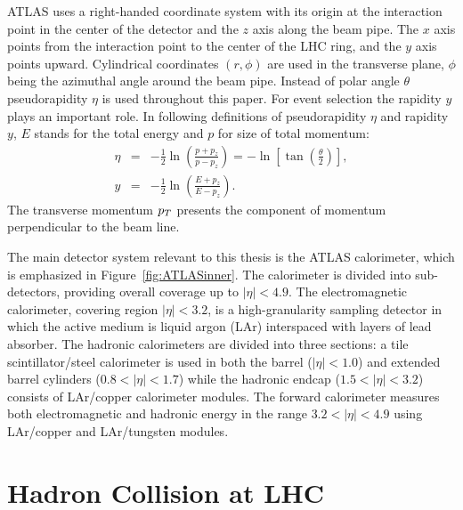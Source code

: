 ATLAS uses a right-handed coordinate system with its origin at the interaction
point in the center of the detector and the $z$ axis along the beam pipe. The
$x$ axis points from the interaction point to the center of the LHC ring, and
the $y$ axis points upward. Cylindrical coordinates $(r, \phi)$ are used in the
transverse plane, $\phi$ being the azimuthal angle around the beam pipe. Instead
of polar angle $\theta$ pseudorapidity $\eta$ is used throughout this paper. For
event selection the rapidity $y$ plays an important role. In following
definitions of pseudorapidity $\eta$ and rapidity $y$, $E$ stands for the total
energy and $p$ for size of total momentum: 
\begin{eqnarray}
  \eta &= & - \frac{1}{2} \ln \left( \frac{p+p_z}{p-p_z} \right) = - \ln \left[
  \tan \left( \frac{\theta}{2} \right) \right], \\ y &= &- \frac{1}{2} \ln
  \left( \frac{E+p_z}{E-p_z} \right).	
\end{eqnarray}
The transverse momentum $p_T$ presents the component of momentum perpendicular
to the beam line.  

The main detector system relevant to this thesis is the ATLAS calorimeter,
which is emphasized in Figure~\ref{fig:ATLASinner}. The calorimeter is divided
into sub-detectors, providing overall coverage up to $|\eta| < 4.9$. The
electromagnetic calorimeter, covering region $|\eta| < 3.2$, is a
high-granularity sampling detector in which the active medium is liquid argon
(LAr) interspaced with layers of lead absorber. The hadronic calorimeters are
divided into three sections: a tile scintillator/steel calorimeter is used in
both the barrel ($|\eta| < 1.0$) and extended barrel cylinders ($0.8 < |\eta| <
1.7$) while the hadronic endcap ($1.5 < |\eta| < 3.2$) consists of LAr/copper
calorimeter modules. The forward calorimeter measures both electromagnetic and
hadronic energy in the range $3.2 < |\eta| < 4.9$ using LAr/copper and
LAr/tungsten modules. 


\section{Hadron Collision at LHC}

